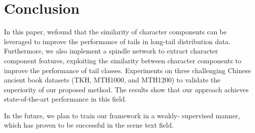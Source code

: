 
\section{Conclusion}

In this paper, wefound that the similarity of character components can be leveraged to improve the performance of tails in long-tail distribution data.
Furthermore, we also implement a spindle network to extract character component features, exploiting the similarity between character components to improve the performance of tail classes.
Experiments on three challenging Chinese ancient book datasets (TKH, MTH1000, and MTH1200) to validate the superiority of our proposed method. The results show that our approach achieves state-of-the-art performance in this field.

In the future, we plan to train our framework in a weakly- supervised manner, which has proven to be successful in the scene text field.

